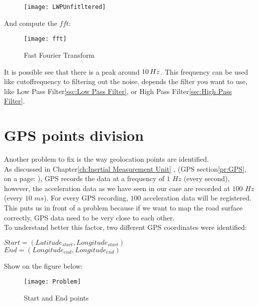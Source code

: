 \documentclass[tesi]{subfiles}
\begin{document}
\begin{figure}[H]
\texttt{[image: LWPUnfitltered]}
\end{figure}


\noindent And compute the $fft$:
\begin{figure}[H]
\centering
\texttt{[image: fft]}
\caption{Fast Fourier Transform}
\end{figure}\label{fig: Fast Fourier Transform}

\noindent It is possible see that there is a peak around $10 \thinspace Hz$. This frequency can be used like cutoffrequency to filtering out the noise, depends the filter you want to use, like Low Pass Filter\ref{ssc:Low Pass Filter}, or High Pass Filter\ref{ssc:High Pass Filter}.



\section{GPS points division} \label{sc:GPS points division}
Another problem to fix is the way geolocation points are identified.\\
As discussed in Chapter\ref{ch:Inertial Measurement Unit} , (GPS section\ref{pr:GPS}, on a page: \pageref{pr:GPS}), GPS records the data at a frequency of $1$ $Hz$ (every second), however, the acceleration data as we have seen in our case are recorded at $100$ $Hz$ (every $10$ $ms$). 
For every GPS recording, $100$ acceleration data will be registered. This puts us in front of a problem because if we want to map the road surface correctly, GPS data need to be very close to each other.\\
To understand better this factor, two different GPS coordinates were identified:

\begin{center}
 $Start = (Latitude_{start}, Longitude_{start})$\\
 $End = (Longitude_{end}, Longitude_{end})$
\end{center}

\noindent Show on the figure below:
\vspace{0.15cm}
\begin{figure}[H]	

\centering
\texttt{[image: Problem]} \label{GPS Points Problem}
 \caption{Start and End points}
  \label{fig:GPS Points Problem}
\end{figure}
\end{document}
